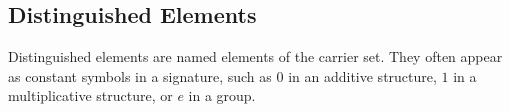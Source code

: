 \subsection*{Distinguished Elements}
\label{subsec:structure-distinguished-elements}

\begin{remark*}[Exposition]
Distinguished elements are named elements of the carrier set.  They often
appear as constant symbols in a signature, such as $0$ in an additive structure,
$1$ in a multiplicative structure, or $e$ in a group.
\end{remark*}
